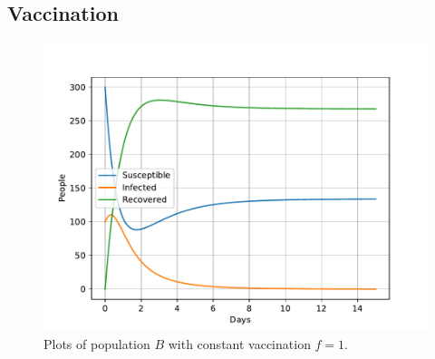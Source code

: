 \documentclass[a4paper]{article}
\let\Oldsubsection\subsection
\renewcommand{\subsection}{\FloatBarrier\Oldsubsection}
\begin{document}
\subsection{Vaccination}

\begin{figure}[!htb]
	\centering 
	\includegraphics[scale=0.56]{../plots/opp_e_B0.pdf}	
	\caption{Plots of population $B$ with constant vaccination $f=1$.}
	\label{opp_e0}
\end{figure}
\end{document}
